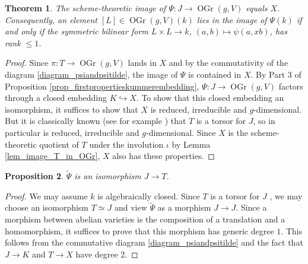 \documentclass{article} %
\newtheorem{proposition}{Proposition}[section]
\newtheorem{theorem}[proposition]{Theorem}
\numberwithin{equation}{section}
\DeclareMathOperator{\OGr}{OGr}
\begin{document}
\begin{theorem}\label{theorem_imagePsi_X}
    The scheme-theoretic image of $\Psi\colon J\rightarrow \OGr(g,V)$ equals $X$.
    Consequently, an element $[L]\in \OGr(g,V)(k)$ lies in the image of $\Psi(k)$ if and only if the symmetric bilinear form $L \times L \to k$, $(a, b) \mapsto \psi(a, x b)$, has rank $\leq 1$. 
\end{theorem}
\begin{proof}
    Since $\pi\colon T\rightarrow \OGr(g,V)$ lands in $X$ and by the commutativity of the diagram \eqref{diagram_psiandpsitilde}, the image of $\Psi$ is contained in $X$.
    By Part 3 of Proposition \ref{prop_firstpropertieskummerembedding}, $\Psi\colon J\rightarrow \OGr(g,V)$ factors through a closed embedding $K\hookrightarrow X$.
    To show that this closed embedding an isomorphism, it suffices to show that $X$ is reduced, irreducible and $g$-dimensional.
    But it is classically known (see for example \cite[Section 2.2]{Wan18}) that $T$ is a torsor for $J$, so in particular is reduced, irreducible and $g$-dimensional.
    Since $X$ is the scheme-theoretic quotient of $T$ under the involution $\iota$ by Lemma \ref{lem_image_T_in_OGr}, $X$ also has these properties.
\end{proof}





\begin{proposition}\label{prop_J_iso_T}
    $\tilde{\Psi}$ is an isomorphism $J\rightarrow T$.
\end{proposition}
\begin{proof}
    We may assume $k$ is algebraically closed.
    Since $T$ is a torsor for $J$ \cite[Section 2.2]{Wan18}, we may choose an isomorphism $T\simeq J$ and view $\tilde{\Psi}$ as a morphism $J\rightarrow J$.
    Since a morphism between abelian varieties is the composition of a translation and a homomorphism, it suffices to prove that this morphism has generic degree $1$.
    This follows from the commutative diagram \eqref{diagram_psiandpsitilde} and the fact that $J\rightarrow K$ and $T\rightarrow X$ have degree $2$.
\end{proof}
\end{document}
